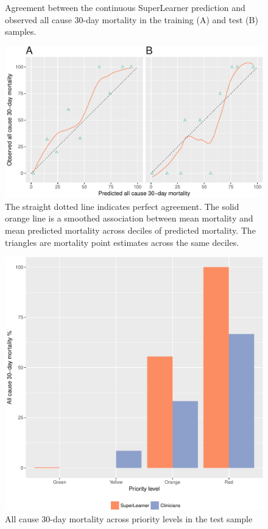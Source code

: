 \documentclass[10pt,letterpaper]{article}\usepackage[]{graphicx}\usepackage[]{color}
\begin{document}
\begin{figure}
  \caption{Agreement between the continuous SuperLearner prediction and observed
    all cause 30-day mortality in the training (A) and test (B) samples.}
  \label{fig:calibration_plot}
  \includegraphics[width=\textwidth]{calibration_plot.pdf}
  \caption*{The straight dotted line indicates perfect agreement. The solid
    orange line is a smoothed association between mean mortality and mean
    predicted mortality across deciles of predicted mortality. The triangles are
    mortality point estimates across the same deciles.}
\end{figure}

\begin{figure}
  \caption{All cause 30-day mortality across priority levels in the test sample}
  \label{fig:mortality_plot}
  \includegraphics[width=\textwidth]{mortality_plot.pdf}
\end{figure}

\end{document}
